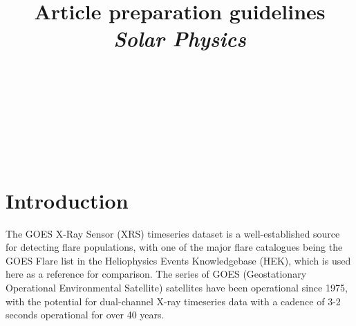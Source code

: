 \documentclass[namedreferences]{solarphysics}
\begin{document}
\begin{article}
\begin{opening}

\title{Article preparation guidelines\\ {\it Solar Physics}}

\author[addressref={aff1,aff2,aff3},corref,email={e-mail.a@mail.com}]{~}%
\author[addressref=aff1,email={e-mail.b@mail.com}]{~}%
\author[corref,email={e-mail.c@mail.com}]{~}%
\author{~}

\address[id=aff1]{First very very very very very very very very very
 very very very very very very very very very very very very very very very very very very long affiliation}
\address[id=aff2]{Second affiliation}
\address[id=aff3]{Third affiliation}


\color{black}
\end{opening}

\section{Introduction}
     \label{S-Introduction}

The GOES X-Ray Sensor (XRS) timeseries dataset is a well-established source for detecting flare populations, with one of the major flare catalogues being the GOES Flare list in the Heliophysics Events Knowledgebase (HEK), which is used here as a reference for comparison. The series of GOES (Geostationary Operational Environmental Satellite) satellites have been operational since 1975, with the potential for dual-channel X-ray timeseries data with a cadence of 3-2 seconds operational for over 40 years.


\end{article}
\end{document}
